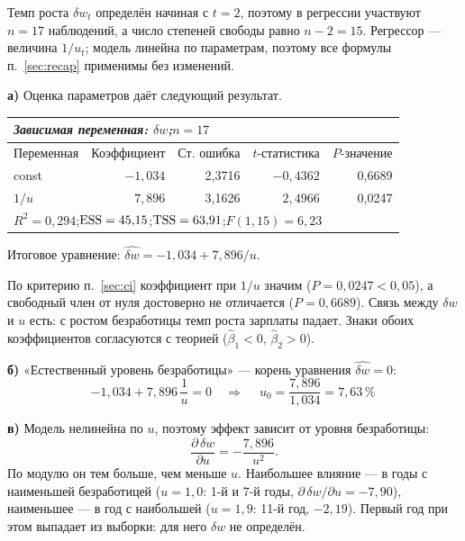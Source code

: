 \ifsolutions\clearpage\fi
\begin{solution}
Темп роста $\delta w_t$ определён начиная с $t = 2$, поэтому в регрессии
участвуют $n = 17$ наблюдений, а число степеней свободы равно $n - 2 = 15$.
Регрессор — величина $1/u_t$; модель линейна по параметрам, поэтому все формулы
п.~\ref{sec:recap} применимы без изменений.

\medskip
\textbf{а)} Оценка параметров даёт следующий результат.

\begin{center}
\begin{tabular}{lrrrr}
\toprule
\multicolumn{5}{l}{\itshape Зависимая переменная: $\delta w$;\quad $n = 17$} \\
\midrule
Переменная & Коэффициент & Ст. ошибка & $t$-статистика & $P$-значение \\
\midrule
const & $-1{,}034$ & 2,3716 & $-0{,}4362$ & 0,6689 \\
$1/u$ & $\phantom{-}7{,}896$ & 3,1626 & $\phantom{-}2{,}4966$ & 0,0247 \\
\midrule
\multicolumn{5}{l}{$R^2 = 0{,}294$;\quad $\mathrm{ESS} = 45{,}15$;\quad $\mathrm{TSS} = 63{,}91$;\quad $F(1,15) = 6{,}23$} \\
\bottomrule
\end{tabular}
\end{center}

\noindent Итоговое уравнение:
$\widehat{\delta w} = -1{,}034 + 7{,}896/u$.

По критерию п.~\ref{sec:ci} коэффициент при $1/u$ значим
($P = 0{,}0247 < 0{,}05$), а свободный член от нуля достоверно не отличается
($P = 0{,}6689$). Связь между $\delta w$ и $u$ есть: с ростом безработицы темп
роста зарплаты падает. Знаки обоих коэффициентов согласуются с теорией
($\widehat{\beta}_1 < 0$, $\widehat{\beta}_2 > 0$).

\medskip
\textbf{б)} «Естественный уровень безработицы» — корень уравнения
$\widehat{\delta w} = 0$:
\[
  -1{,}034 + 7{,}896\,\frac{1}{u} = 0
  \quad\Longrightarrow\quad
  \boxed{\ u_0 = \frac{7{,}896}{1{,}034} = 7{,}63\,\%\ }
\]

\medskip
\textbf{в)} Модель нелинейна по $u$, поэтому эффект зависит от уровня
безработицы:
\[
  \frac{\partial\,\delta w}{\partial u} = -\frac{7{,}896}{u^2} .
\]
По модулю он тем больше, чем меньше $u$. Наибольшее влияние — в годы с
наименьшей безработицей ($u = 1{,}0$: 1-й и 7-й годы,
$\partial\,\delta w/\partial u = -7{,}90$), наименьшее — в год с наибольшей
($u = 1{,}9$: 11-й год, $-2{,}19$). Первый год при этом выпадает из выборки:
для него $\delta w$ не определён.


\end{solution}

